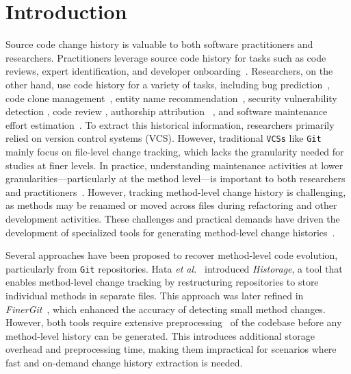 \section{Introduction}
Source code change history is valuable to both software practitioners and researchers. Practitioners leverage source code history for tasks such as code reviews, expert identification, and developer onboarding~\cite{grund_codeshovel_2021}. Researchers, on the other hand, use code history for a variety of tasks, including bug prediction~\cite{chowdhury_method-level_2024, mashhadi_empirical_2024}, code clone management~\cite{duala-ekoko_tracking_2007}, entity name recommendation~\cite{kashiwabara_method_2015}, security vulnerability detection \cite{li_cleanvul_2024}, code review \cite{grund_codeshovel_2021}, authorship attribution ~\cite{meng_mining_2013, rahman_ownership_2011}, and software maintenance effort estimation~\cite{chowdhury_good_2025, chowdhury_evidence_2025, hassan_versioned_2024}. To extract this historical information, researchers primarily relied on version control systems (VCS). However, traditional \texttt{VCSs} like \texttt{Git} mainly focus on file-level change tracking, which lacks the granularity needed for studies at finer levels. In practice, understanding maintenance activities at lower granularities—particularly at the method level—is important to both researchers and practitioners~\cite{grund_codeshovel_2021, chowdhury_evidence_2025, chowdhury_method-level_2024}. However, tracking method-level change history is challenging, as methods may be renamed or moved across files during refactoring and other development activities. These challenges and practical demands have driven the development of specialized tools for generating method-level change histories~\cite{higo_tracking_2020, grund_codeshovel_2021, jodavi_accurate_2022}.

Several approaches have been proposed to recover method-level code evolution, particularly from \texttt{Git} repositories. Hata \textit{et al.}~\cite{hata_historage_2011} introduced \textit{Historage}, a tool that enables method-level change tracking by restructuring repositories to store individual methods in separate files. This approach was later refined in \textit{FinerGit}~\cite{higo_tracking_2020}, which enhanced the accuracy of detecting small method changes. However, both tools require extensive preprocessing~\cite{grund_codeshovel_2021} of the codebase before any method-level history can be generated. This introduces additional storage overhead and preprocessing time, making them impractical for scenarios where fast and on-demand change history extraction is needed.

